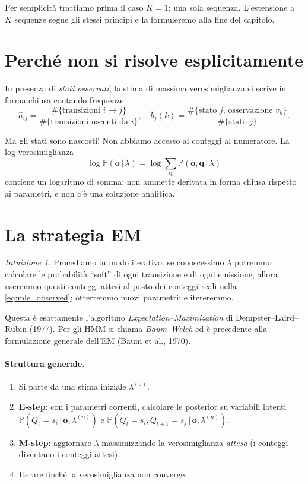 \documentclass[11pt,a4paper,oneside]{book}
\theoremstyle{plain}
\theoremstyle{definition}
\theoremstyle{remark}
\newtheorem*{intuizione}{Intuizione}
\newcommand{\Prob}{\mathbb{P}}
\newcommand{\hmm}{\lambda}                   %
\newcommand{\seqobs}{\mathbf{o}}             %
\newcommand{\seqstates}{\mathbf{q}}          %
\newcommand{\given}{\,\vert\,}
\begin{document}
Per semplicità trattiamo prima il caso $K=1$: una sola sequenza.
L'estensione a $K$ sequenze segue gli stessi principi e la
formuleremo alla fine del capitolo.

\section{Perché non si risolve esplicitamente}

In presenza di \emph{stati osservati}, la stima di massima
verosimiglianza si scrive in forma chiusa contando frequenze:
\begin{equation}
\hat{a}_{ij} = \frac{\#\{\text{transizioni } i\to j\}}{\#\{\text{transizioni
                       uscenti da } i\}},
\quad
\hat{b}_j(k) = \frac{\#\{\text{stato } j\text{, osservazione } v_k\}}
                    {\#\{\text{stato } j\}}.
\label{eq:mle_observed}
\end{equation}

Ma gli stati sono nascosti! Non abbiamo accesso ai conteggi al
numeratore. La log-verosimiglianza
\begin{equation}
\log\Prob(\seqobs\given\hmm)
= \log\sum_{\seqstates}\Prob(\seqobs,\seqstates\given\hmm)
\end{equation}
contiene un logaritmo di somma: non ammette derivata in forma chiusa
rispetto ai parametri, e non c'è una soluzione analitica.

\section{La strategia EM}

\begin{intuizione}
Procediamo in modo iterativo: se conoscessimo $\hmm$ potremmo
calcolare le probabilità ``soft'' di ogni transizione e di ogni
emissione; allora useremmo questi conteggi attesi al posto dei
conteggi reali nella \eqref{eq:mle_observed}; otterremmo nuovi
parametri; e itereremmo.
\end{intuizione}

Questa è esattamente l'algoritmo \emph{Expectation--Maximization} di
Dempster--Laird--Rubin (1977). Per gli HMM si chiama
\emph{Baum--Welch} ed è precedente alla formulazione generale dell'EM
(Baum et al., 1970).

\paragraph{Struttura generale.}
\begin{enumerate}[leftmargin=*]
    \item Si parte da una stima iniziale $\hmm^{(0)}$.
    \item \textbf{E-step}: con i parametri correnti, calcolare le
          posterior su variabili latenti
          $\Prob(Q_t=s_i\given\seqobs,\hmm^{(n)})$ e
          $\Prob(Q_t=s_i,Q_{t+1}=s_j\given\seqobs,\hmm^{(n)})$.
    \item \textbf{M-step}: aggiornare $\hmm$ massimizzando la
          verosimiglianza \emph{attesa} (i conteggi diventano i
          conteggi attesi).
    \item Iterare finché la verosimiglianza non converge.
\end{enumerate}
\end{document}
